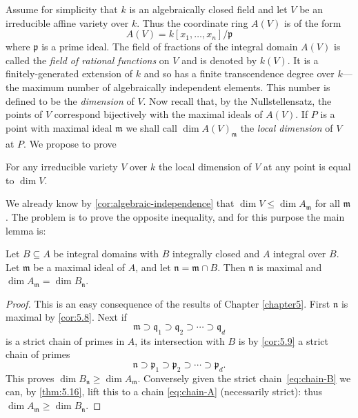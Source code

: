 Assume for simplicity that $k$ is an algebraically closed field and let $V$ be an irreducible affine variety over $k$. Thus the coordinate ring $A(V)$ is of the form
\[
    A(V) = k[x_1, \ldots, x_n]/\mathfrak{p}
\]
where $\mathfrak{p}$ is a prime ideal. The field of fractions of the integral domain $A(V)$ is called the \emph{field of rational functions} on $V$ and is denoted by $k(V)$. It is a finitely-generated extension of $k$ and so has a finite transcendence degree over $k$---the maximum number of algebraically independent elements. This number is defined to be the \emph{dimension} of $V$. Now recall that, by the Nullstellensatz, the points of $V$ correspond bijectively with the maximal ideals of $A(V)$. If $P$ is a point with maximal ideal $\mathfrak{m}$ we shall call $\dim A(V)_{\mathfrak{m}}$ the \emph{local dimension} of $V$ at $P$. We propose to prove

\begin{theorem}\label{thm:local-dim-equal}
For any irreducible variety $V$ over $k$ the local dimension of $V$ at any point is equal to $\dim V$.
\end{theorem}

\begin{remark}
We already know by \eqref{cor:algebraic-independence} that $\dim V \leq \dim A_{\mathfrak{m}}$ for all $\mathfrak{m}$. The problem is to prove the opposite inequality, and for this purpose the main lemma is:
\end{remark}

\begin{lemma}\label{lem:integral-dim}
Let $B \subseteq A$ be integral domains with $B$ integrally closed and $A$ integral over $B$. Let $\mathfrak{m}$ be a maximal ideal of $A$, and let $\mathfrak{n} = \mathfrak{m} \cap B$. Then $\mathfrak{n}$ is maximal and $\dim A_{\mathfrak{m}} = \dim B_{\mathfrak{n}}$.
\end{lemma}

\begin{proof}
This is an easy consequence of the results of Chapter \ref{chapter5}. First $\mathfrak{n}$ is maximal by \eqref{cor:5.8}. Next if
\begin{equation}\label{eq:chain-A}
    \mathfrak{m} \supset \mathfrak{q}_1 \supset \mathfrak{q}_2 \supset \cdots \supset \mathfrak{q}_d \tag{1}
\end{equation}
is a strict chain of primes in $A$, its intersection with $B$ is by \eqref{cor:5.9} a strict chain of primes
\begin{equation}\label{eq:chain-B}
    \mathfrak{n} \supset \mathfrak{p}_1 \supset \mathfrak{p}_2 \supset \cdots \supset \mathfrak{p}_d. \tag{2}
\end{equation}
This proves $\dim B_{\mathfrak{n}} \geq \dim A_{\mathfrak{m}}$. Conversely given the strict chain~\eqref{eq:chain-B} we can, by \eqref{thm:5.16}, lift this to a chain \eqref{eq:chain-A} (necessarily strict): thus $\dim A_{\mathfrak{m}} \geq \dim B_{\mathfrak{n}}$.
\end{proof}

